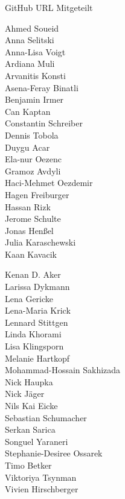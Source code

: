 \documentclass{beamer}
\begin{document}
\begin{frame}{GitHub URL Mitgeteilt}
	
	\scriptsize
	\fboxsep=0pt
	\noindent%
		\begin{minipage}[t]{0.48\linewidth}
		Ahmed Soueid \\
		Anna Selitski \\
		Anna-Lisa Voigt \\
		Ardiana Muli \\
		Arvanitis Konsti \\
		Asena-Feray Binatli \\
		Benjamin Irmer \\
		Can Kaptan \\
		Constantin Schreiber \\
		Dennis Tobola \\
		Duygu Acar \\
		Ela-nur Oezenc \\
		Gramoz Avdyli \\
		Haci-Mehmet Oezdemir \\
		Hagen Freiburger \\
		Hassan Rizk  \\
		Jerome Schulte \\
		Jonas Henßel \\
		Julia Karaschewski \\
		Kaan Kavacik
		\end{minipage}%
	\hfill%
		\begin{minipage}[t]{0.48\linewidth}
		Kenan D. Aker \\
		Larissa Dykmann \\
		Lena Gericke \\
		Lena-Maria Krick \\
		Lennard Stittgen \\
		Linda Khorami \\
		Lisa Klingsporn \\
		Melanie Hartkopf \\
		Mohammad-Hossain Sakhizada \\
		Nick Haupka \\
		Nick Jäger \\
		Nils Kai Eicke \\
		Sebastian Schumacher \\
		Serkan Sarica \\
		Songuel Yaraneri \\
		Stephanie-Desiree Ossarek \\
		Timo Betker \\
		Viktoriya Tsynman \\
		Vivien Hirschberger
		\end{minipage}
	
\end{frame}
\end{document}
